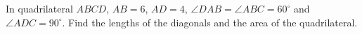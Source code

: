 In quadrilateral $ABCD$, $AB=6$, $AD=4$, $\angle DAB=\angle ABC=60^\circ$ and $\angle ADC=90^\circ$. Find the lengths of the diagonals and the area of the quadrilateral.

